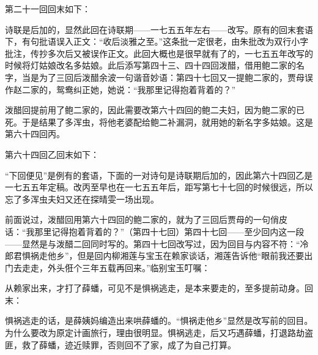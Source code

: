 \par 第二十一回回末如下：
\par 诗联是后加的，显然此回在诗联期——一七五五年左右——改写。原有的回末套语下，有句批语误入正文：“收后淡雅之至。”这条批一定很老，由朱批改为双行小字批注，传抄多次后又被误作正文。此回大概也是很早就有了的，一七五五年改写的时候将灯姑娘改名多姑娘。此后添写第四十三、四十四回泼醋，借用鲍二家的名字，当是为了三回后泼醋余波一句谐音妙语：第四十七回又一提鲍二家的，贾母误作赵二家的，鸳鸯纠正她，她说：“我那里记得抱着背着的？”
\par 泼醋回提前用了鲍二家的，因此需要改第六十四回的鲍二夫妇，因为鲍二家的已死。于是结果了多浑虫，将他老婆配给鲍二补漏洞，就用她的新名字多姑娘。这是第六十四回丙。
\par 第六十四回乙回末如下：
\par “下回便见”是例有的套语，下面的一对诗句是诗联期后加的，因此第六十四回乙是一七五五年定稿。改丙至早也在一七五五年后，距写第七十七回的时候很远，所以忘了多浑虫夫妇又还在探晴雯一场出现。
\par 前面说过，泼醋回用第六十四回的鲍二家的，就为了三回后贾母的一句俏皮话：“我那里记得抱着背着的？”（第四十七回）第四十七回——至少回内这一段——显然是与泼醋二回同时写的。第四十七回改写过，因为回目与内容不符：“冷郎君惧祸走他乡”，但是回内柳湘莲与宝玉在赖家谈话，湘莲告诉他“眼前我还要出门去走走，外头俇个三年五载再回来。”临别宝玉叮嘱：
\par 从赖家出来，才打了薛蟠，可见不是惧祸逃走，是本来要走的，至多提前动身。回末：
\par 惧祸逃走的话，是薛姨妈编造出来哄薛蟠的。“惧祸走他乡”显然是改写前的回目。为什么要改为原定计画旅行，理由很明显。惧祸逃走，后又巧遇薛蟠，打退路劫盗匪，救了薛蟠，迹近赎罪，否则回不了家，成了为自己打算。
